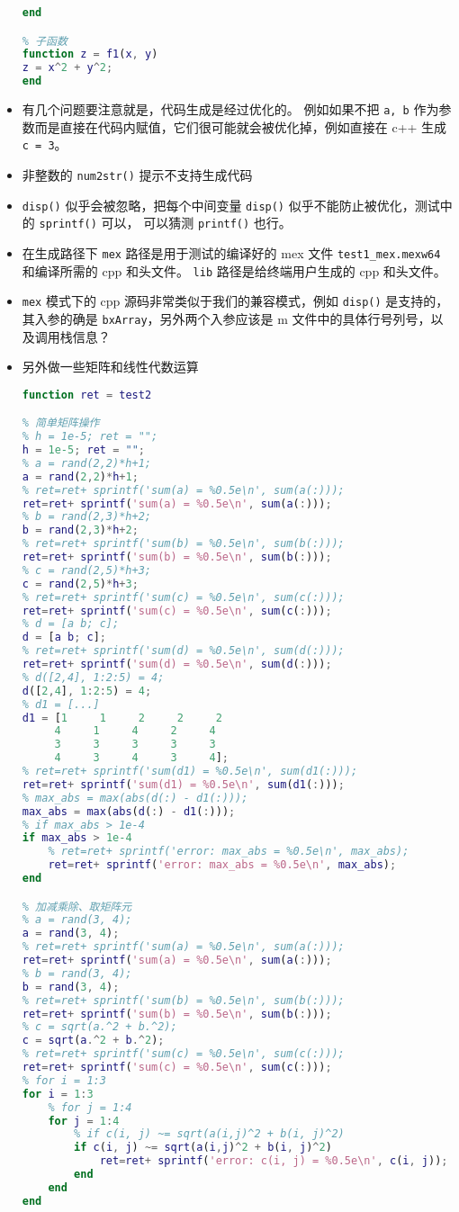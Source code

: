 \begin{itemize}
\begin{lstlisting}[language=matlab,caption=test1.m]
% 正常退出
end

% 子函数
function z = f1(x, y)
z = x^2 + y^2;
end
\end{lstlisting}
\item 有几个问题要注意就是，代码生成是经过优化的。 例如如果不把 \verb`a, b` 作为参数而是直接在代码内赋值，它们很可能就会被优化掉，例如直接在 c++ 生成 \verb`c = 3`。
\item 非整数的 \verb`num2str()` 提示不支持生成代码
\item \verb`disp()` 似乎会被忽略，把每个中间变量 \verb`disp()` 似乎不能防止被优化，测试中的 \verb`sprintf()` 可以， 可以猜测 \verb`printf()` 也行。
\item 在生成路径下 \verb`mex` 路径是用于测试的编译好的 mex 文件 \verb`test1_mex.mexw64` 和编译所需的 cpp 和头文件。 \verb`lib` 路径是给终端用户生成的 cpp 和头文件。
\item \verb`mex` 模式下的 cpp 源码非常类似于我们的兼容模式，例如 \verb`disp()` 是支持的，其入参的确是 \verb`bxArray`，另外两个入参应该是 m 文件中的具体行号列号，以及调用栈信息？
\item 另外做一些矩阵和线性代数运算
\begin{lstlisting}[language=matlab]
function ret = test2

% 简单矩阵操作
% h = 1e-5; ret = "";
h = 1e-5; ret = "";
% a = rand(2,2)*h+1;
a = rand(2,2)*h+1;
% ret=ret+ sprintf('sum(a) = %0.5e\n', sum(a(:)));
ret=ret+ sprintf('sum(a) = %0.5e\n', sum(a(:)));
% b = rand(2,3)*h+2;
b = rand(2,3)*h+2;
% ret=ret+ sprintf('sum(b) = %0.5e\n', sum(b(:)));
ret=ret+ sprintf('sum(b) = %0.5e\n', sum(b(:)));
% c = rand(2,5)*h+3;
c = rand(2,5)*h+3;
% ret=ret+ sprintf('sum(c) = %0.5e\n', sum(c(:)));
ret=ret+ sprintf('sum(c) = %0.5e\n', sum(c(:)));
% d = [a b; c];
d = [a b; c];
% ret=ret+ sprintf('sum(d) = %0.5e\n', sum(d(:)));
ret=ret+ sprintf('sum(d) = %0.5e\n', sum(d(:)));
% d([2,4], 1:2:5) = 4;
d([2,4], 1:2:5) = 4;
% d1 = [...]
d1 = [1     1     2     2     2
     4     1     4     2     4
     3     3     3     3     3
     4     3     4     3     4];
% ret=ret+ sprintf('sum(d1) = %0.5e\n', sum(d1(:)));
ret=ret+ sprintf('sum(d1) = %0.5e\n', sum(d1(:)));
% max_abs = max(abs(d(:) - d1(:)));
max_abs = max(abs(d(:) - d1(:)));
% if max_abs > 1e-4
if max_abs > 1e-4
    % ret=ret+ sprintf('error: max_abs = %0.5e\n', max_abs);
    ret=ret+ sprintf('error: max_abs = %0.5e\n', max_abs);
end

% 加减乘除、取矩阵元
% a = rand(3, 4);
a = rand(3, 4);
% ret=ret+ sprintf('sum(a) = %0.5e\n', sum(a(:)));
ret=ret+ sprintf('sum(a) = %0.5e\n', sum(a(:)));
% b = rand(3, 4);
b = rand(3, 4);
% ret=ret+ sprintf('sum(b) = %0.5e\n', sum(b(:)));
ret=ret+ sprintf('sum(b) = %0.5e\n', sum(b(:)));
% c = sqrt(a.^2 + b.^2);
c = sqrt(a.^2 + b.^2);
% ret=ret+ sprintf('sum(c) = %0.5e\n', sum(c(:)));
ret=ret+ sprintf('sum(c) = %0.5e\n', sum(c(:)));
% for i = 1:3
for i = 1:3
    % for j = 1:4
    for j = 1:4
        % if c(i, j) ~= sqrt(a(i,j)^2 + b(i, j)^2)
        if c(i, j) ~= sqrt(a(i,j)^2 + b(i, j)^2)
            ret=ret+ sprintf('error: c(i, j) = %0.5e\n', c(i, j));
        end
    end
end


\end{lstlisting}
\end{itemize}
